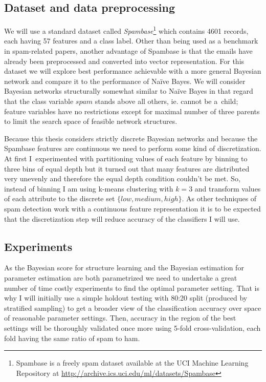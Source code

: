 \documentclass[english,cover]{fitthesis} %
\newcommand{\term}[1]{\emph{#1}}           %
\begin{document}
\subsection{Dataset and data preprocessing}
We will use a standard dataset called \term{Spambase}\footnote{Spambase is a freely spam dataset available at the UCI Machine Learning Repository at \url{http://archive.ics.uci.edu/ml/datasets/Spambase}} which contains 4601 records, each having 57 features and a class label. Other than being used as a benchmark in spam-related papers, another advantage of Spambase is that the emails have already been preprocessed and converted into vector representation. For this dataset we will explore best performance achievable with a more general Bayesian network and compare it to the performance of Naïve Bayes. We will consider Bayesian networks structurally somewhat similar to Naïve Bayes in that regard that the class variable $spam$ stands above all others, ie. cannot be a~child; feature variables have no restrictions except for maximal number of three parents to limit the search space of feasible network structures.

Because this thesis considers strictly discrete Bayesian networks and because the Spambase features are continuous we need to perform some kind of discretization. At first I~experimented with partitioning values of each feature by binning to three bins of equal depth but it turned out that many features are distributed very unevenly and therefore the equal depth condition couldn't be met. So, instead of binning I am using k-means clustering with $k=3$ and transform values of each attribute to the discrete set $\lbrace low, medium, high \rbrace$. As other techniques of spam detection work with a continuous feature representation it is to be expected that the discretization step will reduce accuracy of the classifiers I will use.


\subsection{Experiments}
As the Bayesian score for structure learning and the Bayesian estimation for parameter estimation are both parametrized we need to undertake a great number of time costly experiments to find the optimal parameter setting. That is why I will initially use a simple holdout testing with 80:20 split (produced by stratified sampling) to get a broader view of the classification accuracy over space of reasonable parameter settings. Then, accuracy in the region of the best settings will be thoroughly validated once more using 5-fold cross-validation, each fold having the same ratio of spam to ham.
\end{document}

